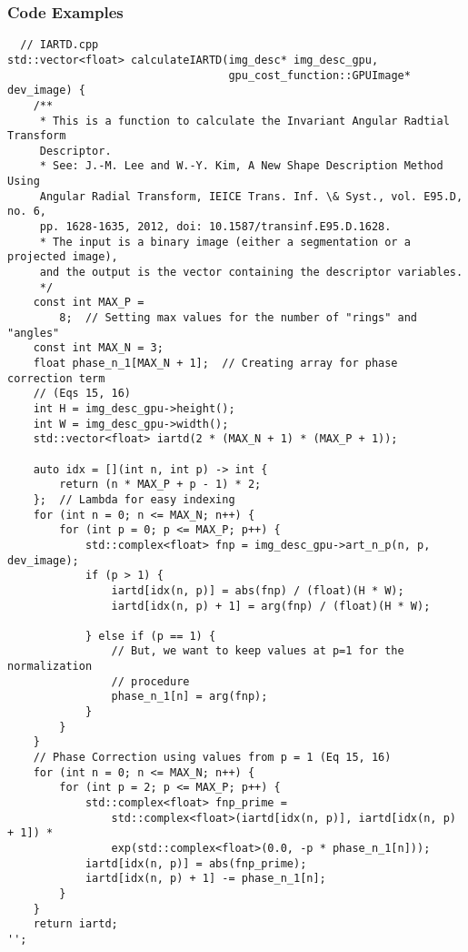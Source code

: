 \subsubsection{Code Examples}

\begin{lstlisting}
  // IARTD.cpp
std::vector<float> calculateIARTD(img_desc* img_desc_gpu,
                                  gpu_cost_function::GPUImage* dev_image) {
    /**
     * This is a function to calculate the Invariant Angular Radtial Transform
     Descriptor.
     * See: J.-M. Lee and W.-Y. Kim, A New Shape Description Method Using
     Angular Radial Transform, IEICE Trans. Inf. \& Syst., vol. E95.D, no. 6,
     pp. 1628-1635, 2012, doi: 10.1587/transinf.E95.D.1628.
     * The input is a binary image (either a segmentation or a projected image),
     and the output is the vector containing the descriptor variables.
     */
    const int MAX_P =
        8;  // Setting max values for the number of "rings" and "angles"
    const int MAX_N = 3;
    float phase_n_1[MAX_N + 1];  // Creating array for phase correction term
    // (Eqs 15, 16)
    int H = img_desc_gpu->height();
    int W = img_desc_gpu->width();
    std::vector<float> iartd(2 * (MAX_N + 1) * (MAX_P + 1));

    auto idx = [](int n, int p) -> int {
        return (n * MAX_P + p - 1) * 2;
    };  // Lambda for easy indexing
    for (int n = 0; n <= MAX_N; n++) {
        for (int p = 0; p <= MAX_P; p++) {
            std::complex<float> fnp = img_desc_gpu->art_n_p(n, p, dev_image);
            if (p > 1) {
                iartd[idx(n, p)] = abs(fnp) / (float)(H * W);
                iartd[idx(n, p) + 1] = arg(fnp) / (float)(H * W);

            } else if (p == 1) {
                // But, we want to keep values at p=1 for the normalization
                // procedure
                phase_n_1[n] = arg(fnp);
            }
        }
    }
    // Phase Correction using values from p = 1 (Eq 15, 16)
    for (int n = 0; n <= MAX_N; n++) {
        for (int p = 2; p <= MAX_P; p++) {
            std::complex<float> fnp_prime =
                std::complex<float>(iartd[idx(n, p)], iartd[idx(n, p) + 1]) *
                exp(std::complex<float>(0.0, -p * phase_n_1[n]));
            iartd[idx(n, p)] = abs(fnp_prime);
            iartd[idx(n, p) + 1] -= phase_n_1[n];
        }
    }
    return iartd;
'';
\end{lstlisting}

